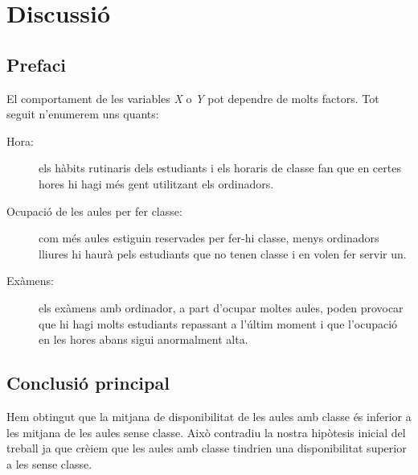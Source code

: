 \section{Discussió}
\subsection{Prefaci}
El comportament de les variables \emph{X} o \emph{Y} pot dependre de molts factors. Tot seguit n'enumerem uns quants:
\begin{description}
	\item[Hora:] els hàbits rutinaris dels estudiants i els horaris de classe fan que en certes hores hi hagi més gent utilitzant els ordinadors.
	\item[Ocupació de les aules per fer classe:] com més aules estiguin reservades per fer-hi classe, menys ordinadors lliures hi haurà pels estudiants que no tenen classe i en volen fer servir un.
	\item[Exàmens:] els exàmens amb ordinador, a part d'ocupar moltes aules, poden provocar que hi hagi molts estudiants repassant a l'últim moment i que l'ocupació en les hores abans sigui anormalment alta.
\end{description}

\subsection{Conclusió principal}
Hem obtingut que la mitjana de disponibilitat de les aules amb classe és inferior a les mitjana de les aules sense classe. Això contradiu la nostra hipòtesis inicial del treball ja que crèiem que les aules amb classe tindrien una disponibilitat superior a les sense classe. 


